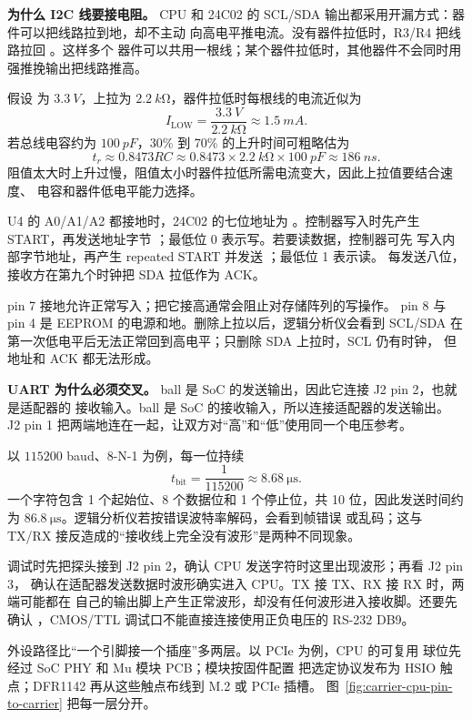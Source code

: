 \textbf{为什么 I2C 线要接电阻。}
CPU 和 24C02 的 SCL/SDA 输出都采用开漏方式：器件可以把线路拉到地，却不主动
向高电平推电流。没有器件拉低时，R3/R4 把线路拉回 。这样多个
器件可以共用一根线；某个器件拉低时，其他器件不会同时用强推挽输出把线路推高。

假设  为 \(\SI{3.3}{V}\)，上拉为
\(\SI{2.2}{k\ohm}\)，器件拉低时每根线的电流近似为
\[
  I_{\mathrm{LOW}}
  = \frac{\SI{3.3}{V}}{\SI{2.2}{k\ohm}}
  \approx \SI{1.5}{mA}.
\]
若总线电容约为 \(\SI{100}{pF}\)，30\% 到 70\% 的上升时间可粗略估为
\[
  t_r \approx 0.8473 R C
      \approx 0.8473 \times \SI{2.2}{k\ohm}
      \times \SI{100}{pF}
      \approx \SI{186}{ns}.
\]
阻值太大时上升过慢，阻值太小时器件拉低所需电流变大，因此上拉值要结合速度、
电容和器件低电平能力选择。

U4 的 A0/A1/A2 都接地时，24C02 的七位地址为 。控制器写入时先产生
START，再发送地址字节 ；最低位 0 表示写。若要读数据，控制器可先
写入内部字节地址，再产生 repeated START 并发送 ；最低位 1 表示读。
每发送八位，接收方在第九个时钟把 SDA 拉低作为 ACK。

pin 7  接地允许正常写入；把它接高通常会阻止对存储阵列的写操作。
pin 8 与 pin 4 是 EEPROM 的电源和地。删除上拉以后，逻辑分析仪会看到 SCL/SDA
在第一次低电平后无法正常回到高电平；只删除 SDA 上拉时，SCL 仍有时钟，
但地址和 ACK 都无法形成。

\textbf{UART 为什么必须交叉。}
ball  是 SoC 的发送输出，因此它连接 J2 pin 2，也就是适配器的
接收输入。ball  是 SoC 的接收输入，所以连接适配器的发送输出。
J2 pin 1 把两端地连在一起，让双方对“高”和“低”使用同一个电压参考。

以 \(115200\) baud、8-N-1 为例，每一位持续
\[
  t_{\mathrm{bit}} = \frac{1}{115200}
  \approx \SI{8.68}{\micro\second}.
\]
一个字符包含 1 个起始位、8 个数据位和 1 个停止位，共 10 位，因此发送时间约
为 \(\SI{86.8}{\micro\second}\)。逻辑分析仪若按错误波特率解码，会看到帧错误
或乱码；这与 TX/RX 接反造成的“接收线上完全没有波形”是两种不同现象。

调试时先把探头接到 J2 pin 2，确认 CPU 发送字符时这里出现波形；再看 J2 pin 3，
确认在适配器发送数据时波形确实进入 CPU。TX 接 TX、RX 接 RX 时，两端可能都在
自己的输出脚上产生正常波形，却没有任何波形进入接收脚。还要先确认
，CMOS/TTL 调试口不能直接连接使用正负电压的 RS-232 DB9。

%
外设路径比“一个引脚接一个插座”多两层。以 PCIe 为例，CPU 的可复用
 球位先经过 SoC PHY 和 Mu 模块 PCB；模块按固件配置
把选定协议发布为 HSIO 触点；DFR1142 再从这些触点布线到 M.2 或 PCIe 插槽。
图~\ref{fig:carrier-cpu-pin-to-carrier} 把每一层分开。

